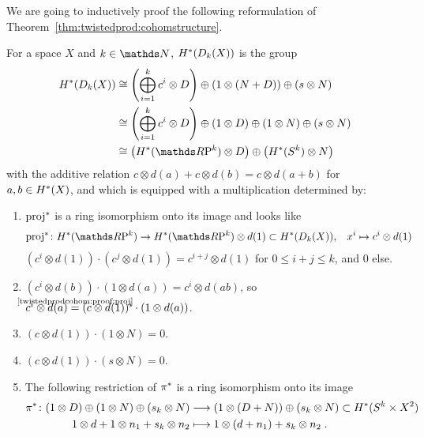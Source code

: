 We are going to inductively proof the following reformulation of
Theorem~\ref{thm:twistedprod:cohomstructure}.
\begin{Thm}\label{thm:twistedprod:cohomstructure:alt}
  For a space $X$ and $k\in\Nat$, $H^*(D_{k}({X}))$ is the group
  \begin{align*}
    \H^*(\Twistedprod{k}{X})
    &\cong
      \left(\bigoplus_{i=1}^k c^i\otimes D\right)
      \oplus (1\otimes(N+D))
      \oplus (s\otimes N)
    \\
    &\cong
      \left(\bigoplus_{i=1}^k c^i\otimes D\right)
      \oplus (1\otimes D)
      \oplus (1\otimes N)
      \oplus (s\otimes N)
    \\
    &\cong
      \left(\H^*(\RP k) \otimes D \right)
      \oplus \left(\H^*(\Sphere k) \otimes N\right)
  \end{align*}
  with the additive relation $c\otimes d(a)+c\otimes d(b)=c\otimes d(a+b)$ for
  $a,b\in H^*(X)$, and which is equipped with a multiplication determined by:
  \begin{enumerate}
  \item\label{twistedprodcohom:proof:proj}
    ${\mathrm{proj}}^*$ is a ring isomorphism onto its image and looks like
    \begin{align*}
      \pb\proj\colon \H^*(\RP k) &\to \H^*(\RP k)\otimes d(1)
                                   \subset \H^*(\Twistedprod k X),
      &x^i &\mapsto c^i\otimes d(1)
    \end{align*}
    \idest
    $(c^i\otimes d(1))\cdot(c^j\otimes d(1)) = c^{i+j}\otimes d(1)$
    for $0\leq i+j\leq k$, and $0$ else.
  \item
    $(c^i\otimes d(b)) \cdot (1\otimes d(a)) = c^i\otimes d(ab)$,
    so
    $c^i\otimes d(a)
    \cequalsby{\ref{twistedprodcohom:proof:proj}}
    (c\otimes d(1))^i\cdot (1\otimes d(a))$.
  \item 
    $(c\otimes d(1)) \cdot (1\otimes N) = 0$.
  \item 
    $(c\otimes d(1)) \cdot (s\otimes N) = 0$.
  \item The following restriction of ${\pi}^*$ is a ring isomorphism onto
    its image
    \begin{align*}
      \pb\pi\colon
      (1\otimes D)\oplus (1\otimes N)\oplus(s_k \otimes N)
      &\longto
        (1\otimes(D+N))\oplus(s_k\otimes N)
        \subset\H^*(\Sphere k\times X^2)
      \\
      1\otimes d + 1\otimes n_1 + s_k\otimes n_2
      &\longmapsto
        1\otimes(d+n_1) + s_k\otimes n_2
        \;.

\end{align*}
\end{enumerate}
\end{Thm}
